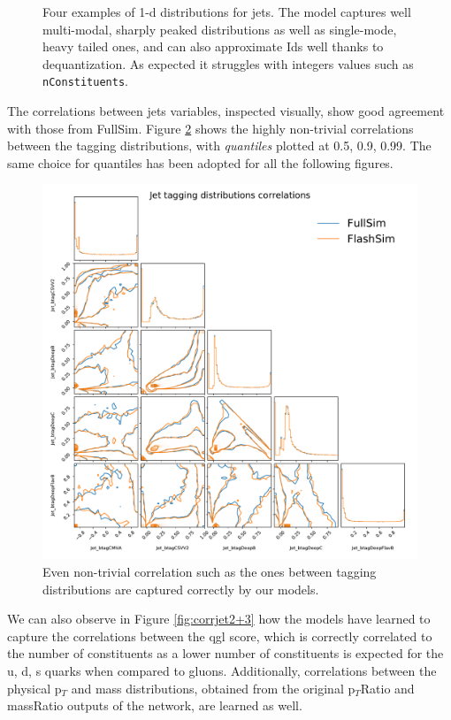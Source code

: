 \begin{figure}
    \caption[1-d jets distributions]{Four examples of 1-d distributions for jets. The model captures well multi-modal, sharply peaked distributions as well as single-mode, heavy tailed ones, and can also approximate Ids well thanks to dequantization. As expected it struggles with integers values such as \texttt{nConstituents}.}\label{fig:jetsdists}
    
\end{figure}

The correlations between jets variables, inspected visually, show good agreement with those from FullSim. Figure \ref{fig:corrjet1} shows the highly non-trivial correlations between the tagging distributions, with \emph{quantiles} plotted at 0.5, 0.9, 0.99. The same choice for quantiles has been adopted for all the following figures.

\begin{figure}
    \centering
    \includegraphics[width=1.2\linewidth]{gfx/ch5/corrjet1.pdf}
    \caption[Tagging correlations]{Even non-trivial correlation such as the ones between tagging distributions are captured correctly by our models.}
    \label{fig:corrjet1}
\end{figure}

We can also observe in Figure \ref{fig:corrjet2+3} how the models have learned to capture the correlations between the qgl score, which is correctly correlated to the number of constituents as a lower number of constituents is expected for the u, d, s quarks when compared to gluons. Additionally, correlations between the physical p$_T$ and mass distributions, obtained from the original p$_T$Ratio and massRatio outputs of the network, are learned as well.

